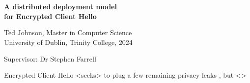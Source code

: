 \chapter*{}
\thispagestyle{empty}

\vspace*{0mm}
\begin{center}
\setlength{\unitlength}{1mm}

\begin{spacing}{2}
\textbf{\Large A distributed deployment model \\ for Encrypted Client Hello} \\[10mm]
\end{spacing}

\begin{spacing}{1.5}
Ted Johnson, Master in Computer Science \\
University of Dublin, Trinity College, 2024 \\[10mm]
\end{spacing}

Supervisor: Dr Stephen Farrell \\
\end{center}
\vspace{5mm}

\begin{spacing}{1} \noindent
Encrypted Client Hello <seeks> to plug a few remaining privacy leaks , but 
<>
\end{spacing}
